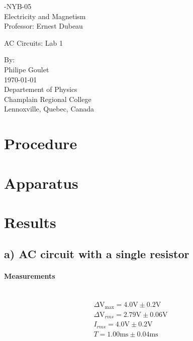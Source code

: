 \documentclass{report}
\begin{document}
\begin{titlepage}
    -NYB-05\\
    Electricity and Magnetism\\
    Professor: Ernest Dubeau\par
    \vspace{5cm}
    \Large AC Circuits: Lab 1\par
    \normalsize
    By:\\
    Philipe Goulet\\
    \vspace*{\fill}
    {\today}\\
    Departement of Physics\\
    Champlain Regional College\\
    Lennoxville, Quebec, Canada
\end{titlepage}
\section*{Procedure}
\section*{Apparatus}
\newpage
\section*{Results}
\subsection*{a) AC circuit with a single resistor}
\paragraph{Measurements}\mbox{}\\
\begin{gather}
    \Delta\si{\volt}_{\max}=4.0\si{\volt}\pm0.2\si{\volt}\\
    \Delta\si{\volt}_{rms}=2.79\si{\volt}\pm0.06\si{\volt} \label{eq:vrmsmeasured}\\
    I_{rms}=4.0\si{\volt}\pm0.2\si{\volt}\\ 
    T=1.00\si{\milli}\si{\second}\pm0.04\si{\milli}\si{\second}
\end{gather}
\end{document}
